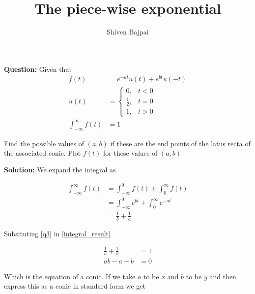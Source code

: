 \documentclass[journal]{IEEEtran}
\begin{document}
\onecolumn

\vspace{3cm}

\renewcommand{\thetable}{\theenumi}

\title{The piece-wise exponential}
\author{Shiven Bajpai}
\maketitle

\renewcommand{\thetable}{\theenumi} 

\setcounter{section}{1}
\textbf{Question: } Given that
\begin{align}
	f(t) &= e^{-at}u(t) + e^{bt}u(-t) \label{q1}\\
	u(t) &= \begin{cases}
		0, & t<0\\
		\frac{1}{2}, & t=0 \\
		1, & t>0
	\end{cases} \label{q2}\\
	\int_{-\infty}^{\infty} f(t) &= 1 \label{q3}
\end{align}

Find the possible values of $(a,b)$ if these are the end points of the latus recta of the associated conic. Plot $f(t)$ for these values of $(a,b)$

\bigskip

\textbf{Solution: } We expand the integral as 

\begin{align}
	\int_{-\infty}^{\infty} f(t) &= \int_{-\infty}^{0} f(t) + \int_{0}^{\infty} f(t)\\
	&= \int_{-\infty}^{0} e^{bt} + \int_{0}^{\infty} e^{-at}\\
	&= \frac{1}{b} + \frac{1}{a} \label{integral_result}
\end{align}

Subsituting \eqref{q3} in \eqref{integral_result}

\begin{align}
	\frac{1}{a} + \frac{1}{b} &= 1\\
	ab - a - b &= 0 \label{conic_ab}
\end{align}

Which is the equation of a conic. 
If we take $a$ to be $x$ and $b$ to be $y$ and then express this as a conic in standard form we get
\end{document}
